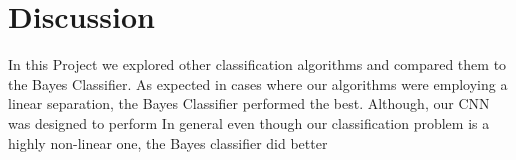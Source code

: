 \documentclass[12pt]{article}
\begin{document}
\section{Discussion}
In this Project we explored other classification algorithms and compared them to the Bayes Classifier.  As expected in cases where our algorithms were employing a linear separation, the Bayes Classifier performed the best. 
Although, our CNN was designed to perform In general even though our classification problem is a highly non-linear one, the Bayes classifier did better 


   
\end{document}
